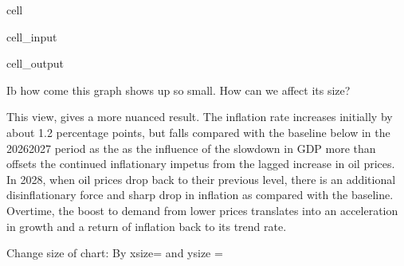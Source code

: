 \documentclass[letterpaper,10pt,english]{jupyterBook}
\begin{document}
\begin{sphinxuseclass}{cell}\begin{sphinxVerbatimInput}

\begin{sphinxuseclass}{cell_input}
\begin{sphinxVerbatim}[commandchars=\\\{\}]
\PYG{p}{[}\PYG{p}{]}
\end{sphinxVerbatim}

\end{sphinxuseclass}\end{sphinxVerbatimInput}
\begin{sphinxVerbatimOutput}

\begin{sphinxuseclass}{cell_output}
\noindent{}

\end{sphinxuseclass}\end{sphinxVerbatimOutput}

\end{sphinxuseclass}
\sphinxAtStartPar
 Ib how come this graph shows up so small.  How can we affect its size?

\sphinxAtStartPar
This view, gives a more nuanced result.  The inflation rate increases initially by about 1.2 percentage points, but falls compared with the baseline below in the 2026\sphinxhyphen{}2027 period as the as the influence of the slowdown in GDP more than offsets the continued inflationary impetus from the lagged increase in oil prices. In 2028, when oil prices drop back to their previous level, there is an additional dis\sphinxhyphen{}inflationary force and sharp drop in inflation as compared with the baseline. Overtime, the boost to demand from lower prices translates into an acceleration in growth and a return of inflation back to its trend rate.

\sphinxAtStartPar
Change size of chart: By xsize=  and ysize =
\end{document}
